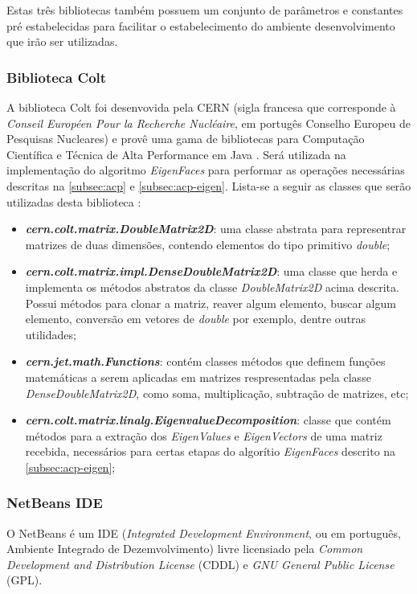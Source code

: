 Estas três bibliotecas também possuem um conjunto de parâmetros e constantes pré estabelecidas para facilitar o estabelecimento do ambiente desenvolvimento que irão ser utilizadas.

\subsubsection{Biblioteca Colt}\label{subsec:bib_colt}
A biblioteca Colt foi desenvovida pela CERN (sigla francesa que corresponde à \textit{Conseil Européen Pour la Recherche Nucléaire}, em portugês Conselho Europeu de Pesquisas Nucleares) e provê uma gama de bibliotecas para Computação Científica e Técnica de Alta Performance em Java \cite{colt}. Será utilizada na implementação do algoritmo \textit{EigenFaces} para performar as operações necessárias descritas na \autoref{subsec:acp} e \autoref{subsec:acp-eigen}. Lista-se a seguir as classes que serão utilizadas desta biblioteca \cite{colt}:


\begin{itemize}
	\item \textbf{\textit{cern.colt.matrix.DoubleMatrix2D}}: uma classe abstrata para representrar matrizes de duas dimensões, contendo elementos do tipo primitivo \textit{double};
	
	\item \textbf{\textit{cern.colt.matrix.impl.DenseDoubleMatrix2D}}: uma classe que herda e implementa os métodos abstratos da classe \textit{DoubleMatrix2D} acima descrita. Possui métodos para clonar a matriz, reaver algum elemento, buscar algum elemento, conversão em vetores de \textit{double} por exemplo, dentre outras utilidades;
			
	\item \textbf{\textit{cern.jet.math.Functions}}:  contém classes métodos que definem funções matemáticas a serem aplicadas em matrizes respresentadas pela classe \textit{DenseDoubleMatrix2D}, como soma, multiplicação, subtração de matrizes, etc;
	
	\item \textbf{\textit{cern.colt.matrix.linalg.EigenvalueDecomposition}}: classe que contém métodos para a extração dos \textit{EigenValues} e \textit{EigenVectors} de uma matriz recebida, necessários para certas etapas do algorítio \textit{EigenFaces} descrito na \autoref{subsec:acp-eigen};
\end{itemize}		

\subsubsection{NetBeans IDE}\label{subsec:netbeans}
O NetBeans é um IDE (\textit{Integrated Development Environment}, ou em português, Ambiente Integrado de Dezemvolvimento) livre licensiado pela \textit{Common Development and Distribution License} (CDDL) e \textit{GNU General Public License} (GPL).

